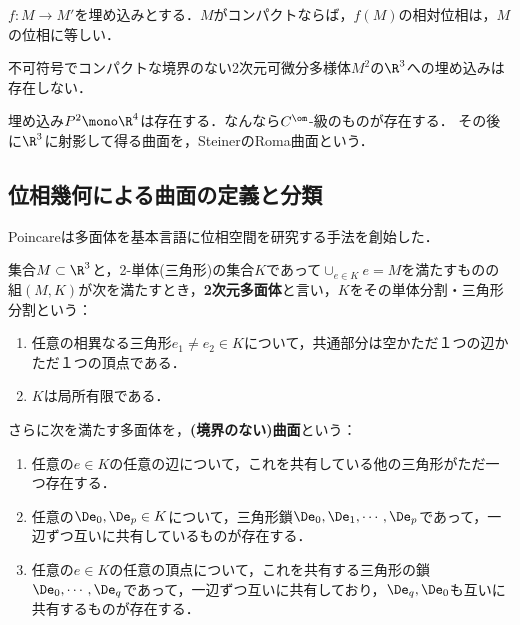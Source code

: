 \documentclass[uplatex,dvipdfmx]{jsreport}
\begin{document}
\begin{theorem}
    $f:M\to M'$を埋め込みとする．$M$がコンパクトならば，$f(M)$の相対位相は，$M$の位相に等しい．
\end{theorem}

\begin{theorem}
    不可符号でコンパクトな境界のない2次元可微分多様体$M^2$の$\R^3$への埋め込みは存在しない．
\end{theorem}
\begin{remarks}
    埋め込み$P^2\mono\R^4$は存在する．なんなら$C^\om$-級のものが存在する．
    その後に$\R^3$に射影して得る曲面を，SteinerのRoma曲面という．
\end{remarks}

\subsection{位相幾何による曲面の定義と分類}

\begin{tcolorbox}[colframe=ForestGreen, colback=ForestGreen!10!white,breakable,colbacktitle=ForestGreen!40!white,coltitle=black,fonttitle=\bfseries\sffamily,
title=]
    Poincareは多面体を基本言語に位相空間を研究する手法を創始した．
\end{tcolorbox}

\begin{definition}
    集合$M\subset\R^3$と，2-単体(三角形)の集合$K$であって$\cup_{e\in K}e=M$を満たすものの組$(M,K)$が次を満たすとき，\textbf{2次元多面体}と言い，$K$をその単体分割・三角形分割という：
    \begin{enumerate}
        \item 任意の相異なる三角形$e_1\ne e_2\in K$について，共通部分は空かただ１つの辺かただ１つの頂点である．
        \item $K$は局所有限である．
    \end{enumerate}
    さらに次を満たす多面体を，\textbf{(境界のない)曲面}という：
    \begin{enumerate}
        \item 任意の$e\in K$の任意の辺について，これを共有している他の三角形がただ一つ存在する．
        \item 任意の$\De_0,\De_p\in K$について，三角形鎖$\De_0,\De_1,\cdots,\De_p$であって，一辺ずつ互いに共有しているものが存在する．
        \item 任意の$e\in K$の任意の頂点について，これを共有する三角形の鎖$\De_0,\cdots,\De_q$であって，一辺ずつ互いに共有しており，$\De_q,\De_0$も互いに共有するものが存在する．
    \end{enumerate}
\end{definition}
\end{document}
